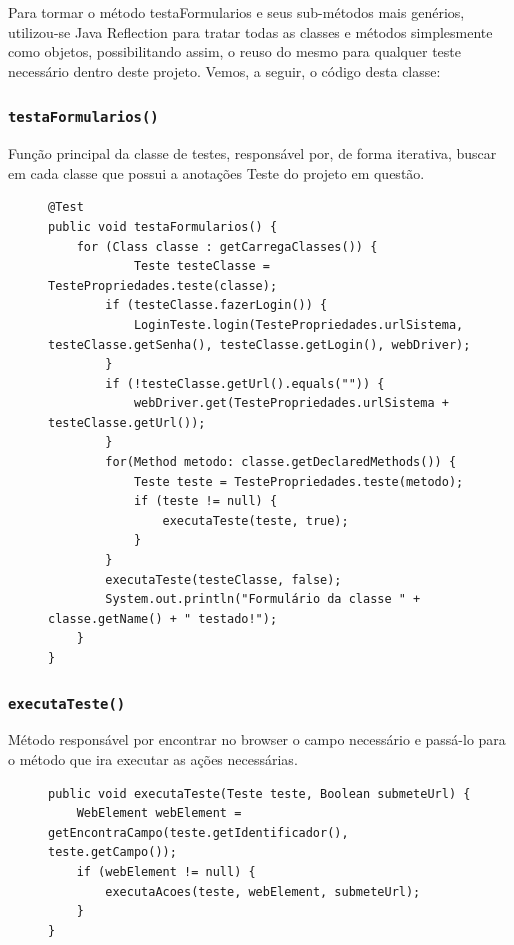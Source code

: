 \documentclass[tg]{mdtufsm}
\begin{document}
	Para tormar o método testaFormularios e seus sub-métodos mais genérios, utilizou-se Java Reflection para tratar todas as classes e métodos simplesmente como objetos, possibilitando assim, o reuso do mesmo para qualquer teste necessário dentro deste projeto. Vemos, a seguir, o código desta classe:
	
\subsubsection{\texttt{testaFormularios()}}
Função principal da classe de testes, responsável por, de forma iterativa, buscar em cada classe que possui a anotações Teste do projeto em questão.

\begin{figure}[!htb]
\begin{lstlisting}
@Test
public void testaFormularios() {
	for (Class classe : getCarregaClasses()) {
    		Teste testeClasse = TestePropriedades.teste(classe);
        if (testeClasse.fazerLogin()) {
            LoginTeste.login(TestePropriedades.urlSistema, testeClasse.getSenha(), testeClasse.getLogin(), webDriver);
        }
        if (!testeClasse.getUrl().equals("")) {
            webDriver.get(TestePropriedades.urlSistema + testeClasse.getUrl());
        }
        for(Method metodo: classe.getDeclaredMethods()) {
            Teste teste = TestePropriedades.teste(metodo);
            if (teste != null) {    
                executaTeste(teste, true);
            }
        }
        executaTeste(testeClasse, false);
        System.out.println("Formulário da classe " + classe.getName() + " testado!");
	}     
}	
\end{lstlisting}
	\label{code:testaFormularios}
\end{figure}

\subsubsection{\texttt{executaTeste()}}
Método responsável por encontrar no browser o campo necessário e passá-lo para o método que ira executar as ações necessárias.

\begin{figure}[!htb]
\begin{lstlisting}
public void executaTeste(Teste teste, Boolean submeteUrl) {
    WebElement webElement = getEncontraCampo(teste.getIdentificador(), teste.getCampo());
    if (webElement != null) {
        executaAcoes(teste, webElement, submeteUrl);
    }
}
\end{lstlisting}
	\label{code:executaTeste}
\end{figure}
\end{document}
